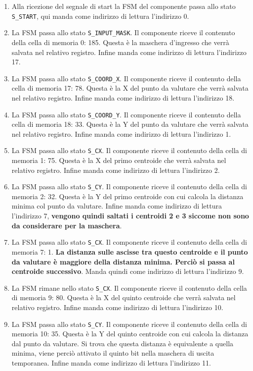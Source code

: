 \documentclass{article}
\begin{document}
\begin{enumerate}
    \item Alla ricezione del segnale di start la FSM del componente passa allo stato \verb^S_START^, qui manda come indirizzo di lettura l'indirizzo 0.
    \item La FSM passa allo stato \verb^S_INPUT_MASK^. Il componente riceve il contenuto della cella di memoria 0: 185. Questa è la maschera d'ingresso che verrà salvata nel relativo registro. Infine manda come indirizzo di lettura l'indirizzo 17.
    \item La FSM passa allo stato \verb^S_COORD_X^. Il componente riceve il contenuto della cella di memoria 17: 78. Questa è la X del punto da valutare che verrà salvata nel relativo registro. Infine manda come indirizzo di lettura l'indirizzo 18.
    \item La FSM passa allo stato \verb^S_COORD_Y^. Il componente riceve il contenuto della cella di memoria 18: 33. Questa è la Y del punto da valutare che verrà salvata nel relativo registro. Infine manda come indirizzo di lettura l'indirizzo 1.
    \item La FSM passa allo stato \verb^S_CX^. Il componente riceve il contenuto della cella di memoria 1: 75. Questa è la X del primo centroide che verrà salvata nel relativo registro. Infine manda come indirizzo di lettura l'indirizzo 2.
    \item La FSM passa allo stato \verb^S_CY^. Il componente riceve il contenuto della cella di memoria 2: 32. Questa è la Y del primo centroide con cui calcola la distanza minima col punto da valutare. Infine manda come indirizzo di lettura l'indirizzo 7, \textbf{vengono quindi saltati i centroidi 2 e 3 siccome non sono da considerare per la maschera}.
    \item La FSM passa allo stato \verb^S_CX^. Il componente riceve il contenuto della cella di memoria 7: 1. \textbf{La distanza sulle ascisse tra questo centroide e il punto da valutare è maggiore della distanza minima. Perciò si passa al centroide successivo}. Manda quindi come indirizzo di lettura l'indirizzo 9.
    \item La FSM rimane nello stato \verb^S_CX^. Il componente riceve il contenuto della cella di memoria 9: 80. Questa è la X del quinto centroide che verrà salvata nel relativo registro. Infine manda come indirizzo di lettura l'indirizzo 10.
    \item La FSM passa allo stato \verb^S_CY^. Il componente riceve il contenuto della cella di memoria 10: 35. Questa è la Y del quinto centroide con cui calcola la distanza dal punto da valutare. Si trova che questa distanza è equivalente a quella minima, viene perciò attivato il quinto bit nella maschera di uscita temporanea. Infine manda come indirizzo di lettura l'indirizzo 11.

\end{enumerate}
\end{document}
